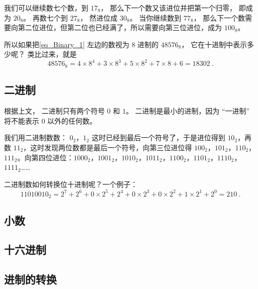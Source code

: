 我们可以继续数七个数，到 $17_\text{8}$， 那么下一个数又该进位并把第一个归零， 即成为 $20_\text{8}$。 再数七个到 $27_\text{8}$， 然进位成 $30_\text{8}$。 当你继续数到 $77_\text{8}$， 那么下一个数需要向第二位进位，但第二位也已经满了，所以需要向第三位进位，成为 $100_\text{8}$。

所以如果把\autoref{eq_Binary_1} 左边的数视为 $8$ 进制的 $48576_\text{8}$， 它在十进制中表示多少呢？ 类比过来，就是
\begin{equation}
48576_\text{8} = 4\times 8^{4} + 3\times 8^{3} + 5\times 8^{2} + 7\times 8 + 6 = 18302~.
\end{equation}

\subsection{二进制}
根据上文， 二进制只有两个符号 $0$ 和 $1$。 二进制是最小的进制，因为 “一进制” 将不能表示 $0$ 以外的任何数。

我们用二进制数数： $0_\text{2}$，$1_\text{2}$ 这时已经到最后一个符号了，于是进位得到 $10_\text{2}$，再数 $11_\text{2}$，这时发现两位数都是最后一个符号，向第三位进位得 $100_\text{2}$，$101_\text{2}$，$110_\text{2}$，$111_\text{2}$。向第四位进位：$1000_\text{2}$，$1001_\text{2}$，$1010_\text{2}$，$1011_\text{2}$，$1100_\text{2}$，$1101_\text{2}$，$1110_\text{2}$，$1111_\text{2}$……

二进制数如何转换位十进制呢？一个例子：
\begin{equation}
11010010_\text{2} = 2^7 + 2^6 + 0\times 2^5 + 2^4 + 0\times 2^3 + 0 \times 2^2 + 1\times 2^1 + 2^0 = 210~.
\end{equation}


\subsection{小数}

\subsection{十六进制}

\subsection{进制的转换}
